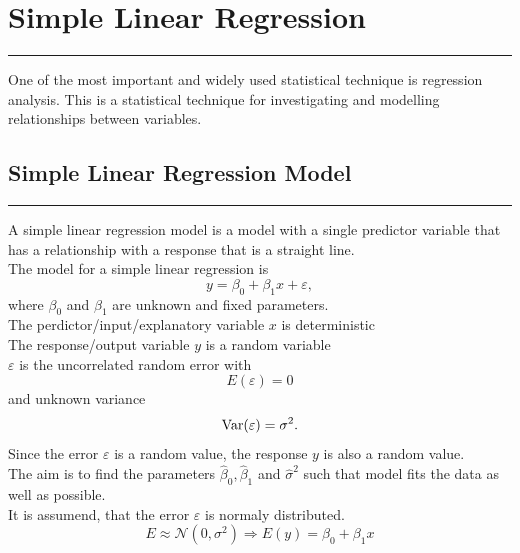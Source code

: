 \section{Simple Linear Regression}
\noindent\rule[\linienAbstand]{\linewidth}{\linienDickeDick}
One of the most important and widely used statistical technique is regression analysis. This is a statistical technique for investigating and modelling relationships between variables.

\subsection{Simple Linear Regression Model}
\noindent\rule[\linienAbstand]{\linewidth}{\linienDicke}
A simple linear regression model is a model with a single predictor variable that has a relationship with a response that is a straight line.\\

The model for a simple linear regression is
\begin{equation}
  y = \beta_0 + \beta_1x + \varepsilon,
\end{equation}
where $\beta_0$ and $\beta_1$ are unknown and fixed parameters.\\

The perdictor/input/explanatory variable $x$ is deterministic\\
The response/output variable $y$ is a random variable\\
$\varepsilon $ is the uncorrelated random error with
\begin{equation}
  E(\varepsilon ) = 0
\end{equation}
and unknown variance
\begin{equation}
  \textup{Var}(\varepsilon ) = \sigma^2.
\end{equation}
Since the error $\varepsilon$ is a random value, the response $y$ is also a random value.\\

The aim is to find the parameters $\hat{\beta}_0, \hat{\beta}_1$ and $\hat{\sigma}^2$ such that model fits the data as well as possible.\\

It is assumend, that the error $\varepsilon$ is normaly distributed.
\begin{equation}
  E \approx \mathcal{N}(0, \sigma^2) \Rightarrow E(y) = \beta_0 + \beta_1 x
\end{equation}

